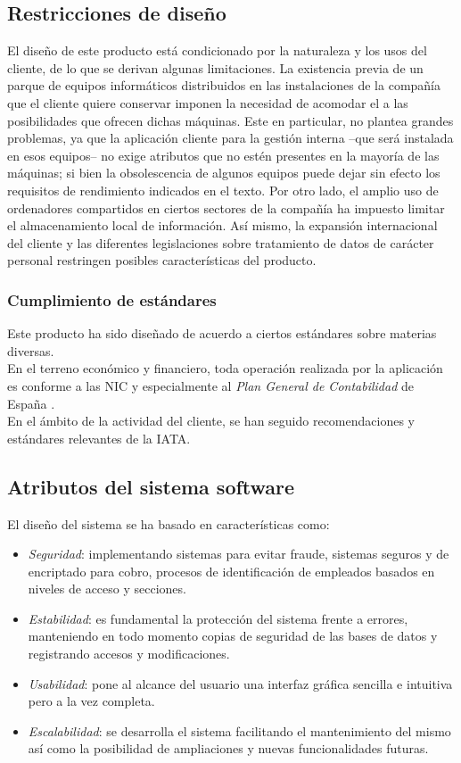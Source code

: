 \documentclass[11pt, a4paper, twoside, titlepage]{article}
\begin{document}
		\subsection{Restricciones de diseño}
			El diseño de este producto está condicionado por la naturaleza y los usos del cliente, de lo que se derivan algunas limitaciones. La existencia previa de un parque de equipos informáticos distribuidos en las instalaciones de la compañía que el cliente quiere conservar imponen la necesidad de acomodar el \software a las posibilidades que ofrecen dichas máquinas. Este en particular, no plantea grandes problemas, ya que la aplicación cliente para la gestión interna --que será instalada en esos equipos-- no exige atributos que no estén presentes en la mayoría de las máquinas; si bien la obsolescencia de algunos equipos puede dejar sin efecto los requisitos de rendimiento indicados en el texto. Por otro lado, el amplio uso de ordenadores compartidos en ciertos sectores de la compañía ha impuesto limitar el almacenamiento local de información. Así mismo, la expansión internacional del cliente y las diferentes legislaciones sobre tratamiento de datos de carácter personal restringen posibles características del producto.
			\subsubsection{Cumplimiento de estándares}
				Este producto ha sido diseñado de acuerdo a ciertos estándares sobre materias diversas.\\
				
				En el terreno económico y financiero, toda operación realizada por la aplicación es conforme a las \gls{NIC} \cite{NIC2006} y especialmente al \textit{Plan General de Contabilidad} de España \cite{PGC2007}.\\

				En el ámbito de la actividad del cliente, se han seguido recomendaciones y estándares relevantes de la \gls{IATA}.
				
		\subsection{Atributos del sistema software}
			El diseño del sistema se ha basado en características como:
			\begin{itemize}
				\item \textit{Seguridad}: implementando sistemas para evitar fraude, sistemas seguros y de encriptado para cobro, procesos de identificación de empleados basados en niveles de acceso y secciones.
				\item \textit{Estabilidad}: es fundamental la protección del sistema frente a errores, manteniendo en todo momento copias de seguridad de las bases de datos y registrando accesos y modificaciones.
				\item \textit{\gls{Usabilidad}}: pone al alcance del usuario una interfaz gráfica sencilla e intuitiva pero a la vez completa.
				\item \textit{Escalabilidad}: se desarrolla el sistema facilitando el mantenimiento del mismo así como la posibilidad de ampliaciones y nuevas funcionalidades futuras.
			\end{itemize}
	
\end{document}
